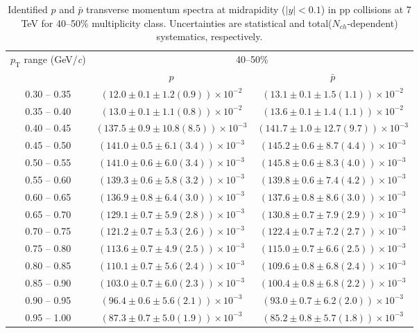 \begin{table}
\caption{Identified $p$ and $\bar{p}$  transverse momentum spectra at midrapidity ($|y|<0.1$) in pp collisions at 7 TeV for 40--50\% multiplicity class. Uncertainties are statistical and total($N_{ch}$-dependent) systematics, respectively.}
\label{tab:ProtonPlus_ProtonMinus_40to50}
\begin{center}
\begin{tabular}{ c | c c }
\hline
\multirow{2}{*}{$p_{\mathrm{T}}$ range (GeV/\textit{c})} & \multicolumn{2}{c}{40--50\%} \\ & $p$& $\bar{p}$\\ 
\hline
0.30 -- 0.35 & $(12.0\pm0.1\pm1.2(0.9))\times10^{-2}$ & $(13.1\pm0.1\pm1.5(1.1))\times10^{-2}$ \\ 
0.35 -- 0.40 & $(13.0\pm0.1\pm1.1(0.8))\times10^{-2}$ & $(13.6\pm0.1\pm1.4(1.1))\times10^{-2}$ \\ 
0.40 -- 0.45 & $(137.5\pm0.9\pm10.8(8.5))\times10^{-3}$ & $(141.7\pm1.0\pm12.7(9.7))\times10^{-3}$ \\ 
0.45 -- 0.50 & $(141.0\pm0.5\pm6.1(3.4))\times10^{-3}$ & $(145.2\pm0.6\pm8.7(4.4))\times10^{-3}$ \\ 
0.50 -- 0.55 & $(141.0\pm0.6\pm6.0(3.4))\times10^{-3}$ & $(145.8\pm0.6\pm8.3(4.0))\times10^{-3}$ \\ 
0.55 -- 0.60 & $(139.3\pm0.6\pm5.8(3.2))\times10^{-3}$ & $(139.8\pm0.6\pm7.4(4.2))\times10^{-3}$ \\ 
0.60 -- 0.65 & $(136.9\pm0.8\pm6.4(3.0))\times10^{-3}$ & $(137.6\pm0.8\pm8.6(3.0))\times10^{-3}$ \\ 
0.65 -- 0.70 & $(129.1\pm0.7\pm5.9(2.8))\times10^{-3}$ & $(130.8\pm0.7\pm7.9(2.9))\times10^{-3}$ \\ 
0.70 -- 0.75 & $(121.2\pm0.7\pm5.3(2.6))\times10^{-3}$ & $(122.4\pm0.7\pm7.2(2.7))\times10^{-3}$ \\ 
0.75 -- 0.80 & $(113.6\pm0.7\pm4.9(2.5))\times10^{-3}$ & $(115.0\pm0.7\pm6.6(2.5))\times10^{-3}$ \\ 
0.80 -- 0.85 & $(110.1\pm0.7\pm5.6(2.4))\times10^{-3}$ & $(109.6\pm0.8\pm6.8(2.4))\times10^{-3}$ \\ 
0.85 -- 0.90 & $(103.0\pm0.7\pm6.0(2.3))\times10^{-3}$ & $(100.4\pm0.8\pm6.8(2.2))\times10^{-3}$ \\ 
0.90 -- 0.95 & $(96.4\pm0.6\pm5.6(2.1))\times10^{-3}$ & $(93.0\pm0.7\pm6.2(2.0))\times10^{-3}$ \\ 
0.95 -- 1.00 & $(87.3\pm0.7\pm5.0(1.9))\times10^{-3}$ & $(85.2\pm0.8\pm5.7(1.8))\times10^{-3}$ \\ 

\end{tabular}
\end{center}
\end{table}
